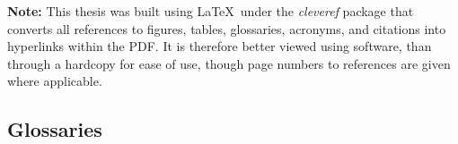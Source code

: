 \documentclass[11pt]{report} %
\begin{document}
\begin{spacing}{1.1}





{\noindent \textbf{Note:} This thesis was built using \LaTeX\  under the \textit{cleveref} package that converts all references to figures, tables, glossaries, acronyms, and citations into hyperlinks within the PDF. It is therefore better viewed using software, than through a hardcopy for ease of use, though page numbers to references are given where applicable.}


\begin{spacing}{1.2}

\end{spacing}

\pagebreak
\tableofcontents
\end{spacing}

\endgroup





\pagebreak







\begin{spacing}{1}

\addtocounter{chapter}{1}
\pagebreak
{}





\appendix

\pagebreak
\chapter{Glossaries}
\printglossary[type=biol,style=long]
\pagebreak
\printglossary[type=comp,style=long]

\end{spacing}


\end{document}
